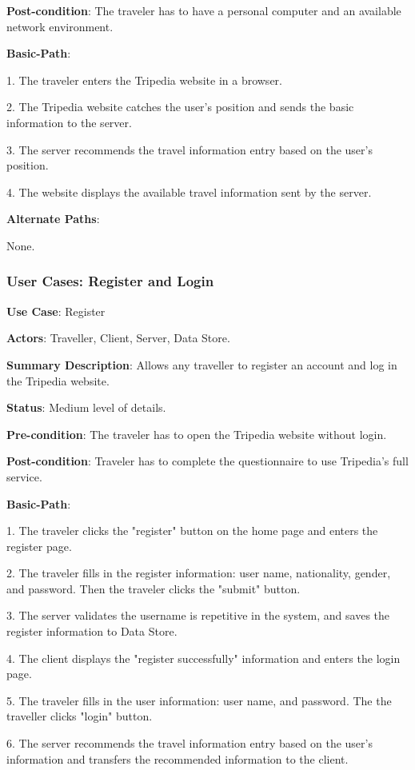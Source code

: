 \documentclass[conference]{IEEEtran}
\begin{document}
\textbf{Post-condition}: The traveler has to have a personal computer and an available network environment.

\textbf{Basic-Path}:

1. The traveler enters the Tripedia website in a browser.

2. The Tripedia website catches the user's position and sends the basic information to the server.

3. The server recommends the travel information entry based on the user's position.

4. The website displays the available travel information sent by the server.

\textbf{Alternate Paths}:

None.

\subsubsection{User Cases: Register and Login}

\textbf{ }

\textbf{Use Case}: Register

\textbf{Actors}: Traveller, Client, Server, Data Store.

\textbf{Summary Description}: Allows any traveller to register an account and log in the Tripedia website.
 
\textbf{Status}: Medium level of details.

\textbf{Pre-condition}: The traveler has to open the Tripedia website without login.

\textbf{Post-condition}: Traveler has to complete the questionnaire to use Tripedia's full service.

\textbf{Basic-Path}:

1. The traveler clicks the "register" button on the home page and enters the register page.

2. The traveler fills in the register information: user name, nationality, gender, and password. Then the traveler clicks the "submit" button.

3. The server validates the username is repetitive in the system, and saves the register information to Data Store.

4. The client displays the "register successfully" information and enters the login page.

5. The traveler fills in the user information: user name, and password. The the traveller clicks "login" button.

6. The server recommends the travel information entry based on the user's information and transfers the recommended information to the client.
\end{document}
